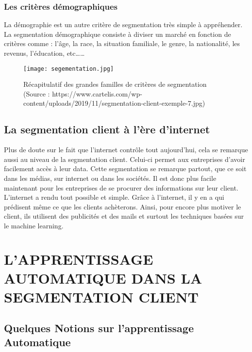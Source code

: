 \documentclass{article}
\begin{document}
\subsubsection{Les critères démographiques}
La démographie est un autre critère de segmentation très simple à appréhender. La segmentation démographique consiste à diviser un marché en fonction de critères comme : l’âge, la race, la situation familiale, le genre, la nationalité, les revenus, l’éducation, etc……
\begin{figure}[h]
   \texttt{[image: segementation.jpg]}
   \caption{Récapitulatif des grandes familles de critères de segmentation (Source : https://www.cartelis.com/wp-content/uploads/2019/11/segmentation-client-exemple-7.jpg)}
\end{figure}
\subsection{La segmentation client à l'ère d'internet}
Plus de doute sur le fait que l’internet contrôle tout aujourd’hui, cela se remarque aussi au niveau de la segmentation client. Celui-ci permet aux entreprises d’avoir facilement accès à leur data. Cette segmentation se remarque partout, que ce soit dans les médias, sur internet ou dans les sociétés. Il est donc  plus facile maintenant pour les entreprises de se procurer des informations sur leur client. L’internet a rendu tout possible et simple. Grâce à l’internet, il y en a qui prédisent même ce que les clients achèterons. Ainsi, pour encore plus motiver le client, ils utilisent des publicités et des mails et surtout les techniques basées sur le machine learning.
\section{L’APPRENTISSAGE AUTOMATIQUE  DANS LA SEGMENTATION CLIENT	}
\subsection{Quelques Notions sur l'apprentissage Automatique}
\end{document}
